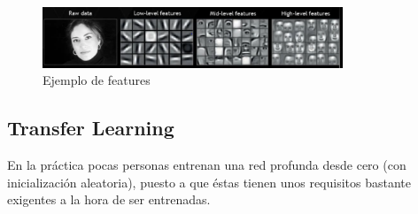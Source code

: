 \documentclass[12,twoside]{TFG-GM}
\theoremstyle{definition}
\theoremstyle{remark}
\begin{document}
\begin{figure}[h]
\centering
\includegraphics[width = 0.8\textwidth]{Images/deepConcept.png} 
\caption{Ejemplo de features \label{fig:deepconcept}}
\end{figure}

\newpage
\subsection{Transfer Learning}

En la práctica pocas personas entrenan una red profunda desde cero (con inicialización aleatoria), puesto a que éstas tienen unos requisitos bastante exigentes a la hora de ser entrenadas. 
\end{document}
